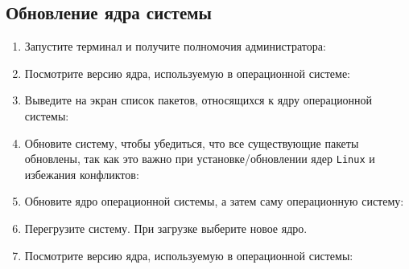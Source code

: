 \documentclass[12pt]{article}
\begin{document}
\subsection{Обновление ядра системы}
\begin{enumerate}
	\item Запустите терминал и получите полномочия администратора:
	\item Посмотрите версию ядра, используемую в операционной системе:
	\item Выведите на экран список пакетов, относящихся к ядру операционной системы:
	\item Обновите систему, чтобы убедиться, что все существующие пакеты обновлены, так как это важно при установке/обновлении ядер \texttt{Linux} и избежания конфликтов:
	\item Обновите ядро операционной системы, а затем саму операционную систему:
	\item Перегрузите систему. При загрузке выберите новое ядро.
	\item Посмотрите версию ядра, используемую в операционной системы:
\end{enumerate}
\end{document}

